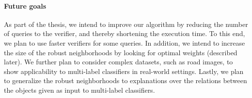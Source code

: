 \paragraph{Future goals}
As part of the thesis, we intend to improve our algorithm by reducing the number of queries to the verifier, and thereby shortening the execution time.
To this end, we plan to use faster verifiers for some queries. %
In addition, we intend to increase the size of the robust neighborhoods by looking for optimal weights (described later). %
We further plan to consider complex datasets, such as road images, to show applicability to multi-label classifiers in real-world settings.
Lastly, we plan to generalize the robust neighborhoods to explanations over the relations between the objects given as input to multi-label classifiers.

%
%
